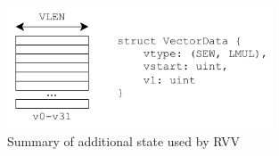 \begin{figure}
    \centering
    \includegraphics[width=0.7\textwidth]{Figures/RVV_Additions.pdf}
    \caption{Summary of additional state used by RVV}
    \label{fig:RVV_added_state}
\end{figure}